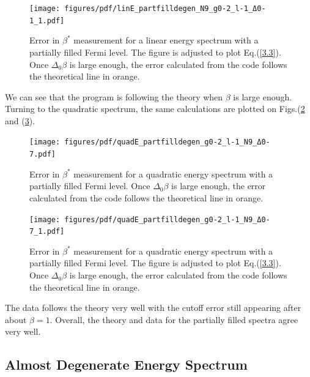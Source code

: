 \begin{figure}[H]
    \centering
    \texttt{[image: figures/pdf/linE\_partfilldegen\_N9\_g0-2\_l-1\_Δ0-1\_1.pdf]}
    \caption{Error in $\beta^*$ measurement for a linear energy spectrum with a partially filled Fermi level. The figure is adjusted to plot Eq.\@ (\ref{3.3}). Once $\Delta_0\beta$ is large enough, the error calculated from the code follows the theoretical line in orange.}
    \label{fig:PartiallyFilledDegenerateLinearSpectrumAdjustedError}
\end{figure}
We can see that the program is following the theory when $\beta$ is large enough. Turning to the quadratic spectrum, the same calculations are plotted on Figs.\@ (\ref{fig:PartiallyFilledDegenerateQuadraticSpectrumError} and (\ref{fig:PartiallyFilledDegenerateQuadraticSpectrumAdjustedError}). 

\begin{figure}[H]
    \centering
    \texttt{[image: figures/pdf/quadE\_partfilldegen\_g0-2\_l-1\_N9\_Δ0-7.pdf]}
    \caption{Error in $\beta^*$ measurement for a quadratic energy spectrum with a partially filled Fermi level. Once $\Delta_0\beta$ is large enough, the error calculated from the code follows the theoretical line in orange.}
    \label{fig:PartiallyFilledDegenerateQuadraticSpectrumError}
\end{figure}

\begin{figure}[H]
    \centering
    \texttt{[image: figures/pdf/quadE\_partfilldegen\_g0-2\_l-1\_N9\_Δ0-7\_1.pdf]}
    \caption{Error in $\beta^*$ measurement for a quadratic energy spectrum with a partially filled Fermi level. The figure is adjusted to plot Eq.\@ (\ref{3.3}). Once $\Delta_0\beta$ is large enough, the error calculated from the code follows the theoretical line in orange.}
    \label{fig:PartiallyFilledDegenerateQuadraticSpectrumAdjustedError}
\end{figure}

The data follows the theory very well with the cutoff error still appearing after about $\beta=1$. Overall, the theory and data for the partially filled spectra agree very well. 
\subsection{Almost Degenerate Energy Spectrum}

